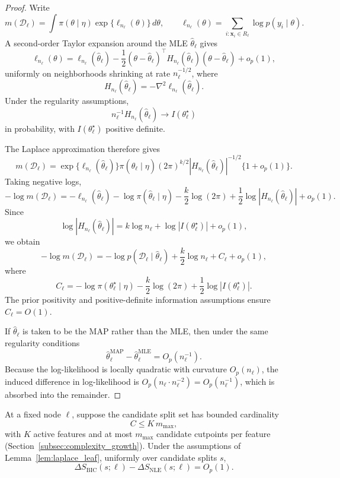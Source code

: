 \begin{proof}
Write
\[
m(\mathcal{D}_\ell)
=
\int
\pi(\theta\mid\eta)
\exp\{\ell_{n_\ell}(\theta)\}
\,d\theta,
\qquad
\ell_{n_\ell}(\theta)
=
\sum_{i:\mathbf{x}_i\in R_\ell}
\log p(y_i\mid\theta).
\]
A second-order Taylor expansion around the MLE $\hat{\theta}_\ell$ gives
\[
\ell_{n_\ell}(\theta)
=
\ell_{n_\ell}(\hat{\theta}_\ell)
-
\frac{1}{2}
(\theta-\hat{\theta}_\ell)^\top
H_{n_\ell}(\hat{\theta}_\ell)
(\theta-\hat{\theta}_\ell)
+
o_p(1),
\]
uniformly on neighborhoods shrinking at rate $n_\ell^{-1/2}$, where
\[
H_{n_\ell}(\hat{\theta}_\ell)
=
-\nabla^2\ell_{n_\ell}(\hat{\theta}_\ell).
\]
Under the regularity assumptions,
\[
n_\ell^{-1}H_{n_\ell}(\hat{\theta}_\ell)
\to
I(\theta_\ell^\star)
\]
in probability, with $I(\theta_\ell^\star)$ positive definite.

The Laplace approximation therefore gives
\[
m(\mathcal{D}_\ell)
=
\exp\{\ell_{n_\ell}(\hat{\theta}_\ell)\}
\pi(\hat{\theta}_\ell\mid\eta)
(2\pi)^{k/2}
|H_{n_\ell}(\hat{\theta}_\ell)|^{-1/2}
\{1+o_p(1)\}.
\]
Taking negative logs,
\[
-\log m(\mathcal{D}_\ell)
=
-\ell_{n_\ell}(\hat{\theta}_\ell)
-
\log \pi(\hat{\theta}_\ell\mid\eta)
-
\frac{k}{2}\log(2\pi)
+
\frac{1}{2}\log |H_{n_\ell}(\hat{\theta}_\ell)|
+
o_p(1).
\]
Since
\[
\log |H_{n_\ell}(\hat{\theta}_\ell)|
=
k\log n_\ell
+
\log |I(\theta_\ell^\star)|
+
o_p(1),
\]
we obtain
\[
-\log m(\mathcal{D}_\ell)
=
-\log p(\mathcal{D}_\ell\mid\hat{\theta}_\ell)
+
\frac{k}{2}\log n_\ell
+
C_\ell
+
o_p(1),
\]
where
\[
C_\ell
=
-\log\pi(\theta_\ell^\star\mid\eta)
-
\frac{k}{2}\log(2\pi)
+
\frac{1}{2}\log |I(\theta_\ell^\star)|.
\]
The prior positivity and positive-definite information assumptions ensure $C_\ell=O(1)$.

If $\hat{\theta}_\ell$ is taken to be the MAP rather than the MLE, then under the same regularity conditions
\[
\hat{\theta}_\ell^{\mathrm{MAP}}
-
\hat{\theta}_\ell^{\mathrm{MLE}}
=
O_p(n_\ell^{-1}).
\]
Because the log-likelihood is locally quadratic with curvature $O_p(n_\ell)$, the induced difference in log-likelihood is $O_p(n_\ell\cdot n_\ell^{-2})=O_p(n_\ell^{-1})$, which is absorbed into the remainder.
\end{proof}

\begin{proposition}
\label{prop:bic_split_validity}
At a fixed node $\ell$, suppose the candidate split set has bounded cardinality
\[
C \le K\,m_{\max},
\]
with $K$ active features and at most $m_{\max}$ candidate cutpoints per feature (Section~\ref{subsec:complexity_growth}).
Under the assumptions of Lemma~\ref{lem:laplace_leaf}, uniformly over candidate splits $s$,
\[
\Delta S_{\mathrm{BIC}}(s;\ell)
-
\Delta S_{\mathrm{NLE}}(s;\ell)
=
O_p(1).
\]
\end{proposition}

